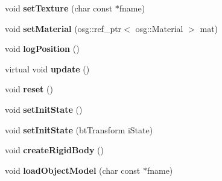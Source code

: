 \begin{DoxyCompactItemize}
void {\bfseries set\+Texture} (char const $\ast$fname)
\item 
\mbox{\label{classbtosgObject_a6ab7b9e0553dab398b980637788b56a8}} 
void {\bfseries set\+Material} (osg\+::ref\+\_\+ptr$<$ osg\+::\+Material $>$ mat)
\item 
\mbox{\label{classbtosgObject_acfd70fa6477c80fd7f29ad7ab9f4f067}} 
void {\bfseries log\+Position} ()
\item 
\mbox{\label{classbtosgObject_a342917817dfde62554f83da8e0d5110b}} 
virtual void {\bfseries update} ()
\item 
\mbox{\label{classbtosgObject_a93983f9180dd0672f8779cf2baa78580}} 
void {\bfseries reset} ()
\item 
\mbox{\label{classbtosgObject_ad1508a0ce28cfac83e5f0ff6245f91b5}} 
void {\bfseries set\+Init\+State} ()
\item 
\mbox{\label{classbtosgObject_a6ceb08e59ee95acaaef389ee198d2b56}} 
void {\bfseries set\+Init\+State} (bt\+Transform i\+State)
\item 
\mbox{\label{classbtosgObject_a029dbe9134fa94e7355799f67fb2cd6d}} 
void {\bfseries create\+Rigid\+Body} ()
\item 
\mbox{\label{classbtosgObject_a91838b8235579da178fcc06e6d3d47f3}} 
void {\bfseries load\+Object\+Model} (char const $\ast$fname)
\end{DoxyCompactItemize}
